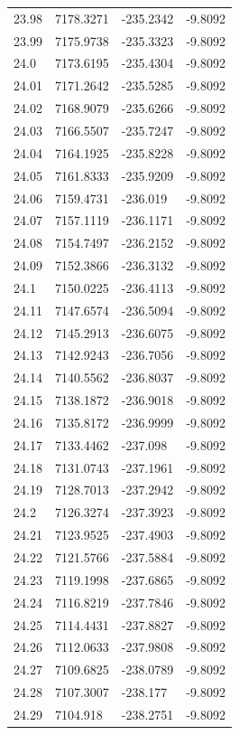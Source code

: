 \begin{table}[H]
\begin{tabular}{llll}
23.98 & 7178.3271 & -235.2342 & -9.8092 \\
23.99 & 7175.9738 & -235.3323 & -9.8092 \\
24.0 & 7173.6195 & -235.4304 & -9.8092 \\
24.01 & 7171.2642 & -235.5285 & -9.8092 \\
24.02 & 7168.9079 & -235.6266 & -9.8092 \\
24.03 & 7166.5507 & -235.7247 & -9.8092 \\
24.04 & 7164.1925 & -235.8228 & -9.8092 \\
24.05 & 7161.8333 & -235.9209 & -9.8092 \\
24.06 & 7159.4731 & -236.019 & -9.8092 \\
24.07 & 7157.1119 & -236.1171 & -9.8092 \\
24.08 & 7154.7497 & -236.2152 & -9.8092 \\
24.09 & 7152.3866 & -236.3132 & -9.8092 \\
24.1 & 7150.0225 & -236.4113 & -9.8092 \\
24.11 & 7147.6574 & -236.5094 & -9.8092 \\
24.12 & 7145.2913 & -236.6075 & -9.8092 \\
24.13 & 7142.9243 & -236.7056 & -9.8092 \\
24.14 & 7140.5562 & -236.8037 & -9.8092 \\
24.15 & 7138.1872 & -236.9018 & -9.8092 \\
24.16 & 7135.8172 & -236.9999 & -9.8092 \\
24.17 & 7133.4462 & -237.098 & -9.8092 \\
24.18 & 7131.0743 & -237.1961 & -9.8092 \\
24.19 & 7128.7013 & -237.2942 & -9.8092 \\
24.2 & 7126.3274 & -237.3923 & -9.8092 \\
24.21 & 7123.9525 & -237.4903 & -9.8092 \\
24.22 & 7121.5766 & -237.5884 & -9.8092 \\
24.23 & 7119.1998 & -237.6865 & -9.8092 \\
24.24 & 7116.8219 & -237.7846 & -9.8092 \\
24.25 & 7114.4431 & -237.8827 & -9.8092 \\
24.26 & 7112.0633 & -237.9808 & -9.8092 \\
24.27 & 7109.6825 & -238.0789 & -9.8092 \\
24.28 & 7107.3007 & -238.177 & -9.8092 \\
24.29 & 7104.918 & -238.2751 & -9.8092 \\

\end{tabular}
\end{table}
